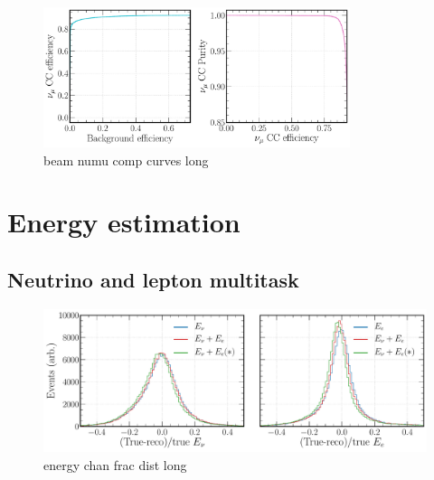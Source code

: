 \begin{figure} %
    \includegraphics[width=0.8\textwidth]{diagrams/7-cvn/chipsnet/beam_numu_comp_curves.pdf}
    \caption[beam numu comp curves short]
    {beam numu comp curves long}
    \label{fig:beam_numu_comp_curves}
\end{figure}

\section{Energy estimation} %
\label{sec:cvn_energy} %

\subsection{Neutrino and lepton multitask} %
\label{sec:cvn_energy_chan} %

\begin{figure} %
    \includegraphics[width=\textwidth]{diagrams/7-cvn/chipsnet/energy_chan_frac_dist.pdf}
    \caption[energy chan frac dist short]
    {energy chan frac dist long}
    \label{fig:energy_chan_frac_dist}
\end{figure}

